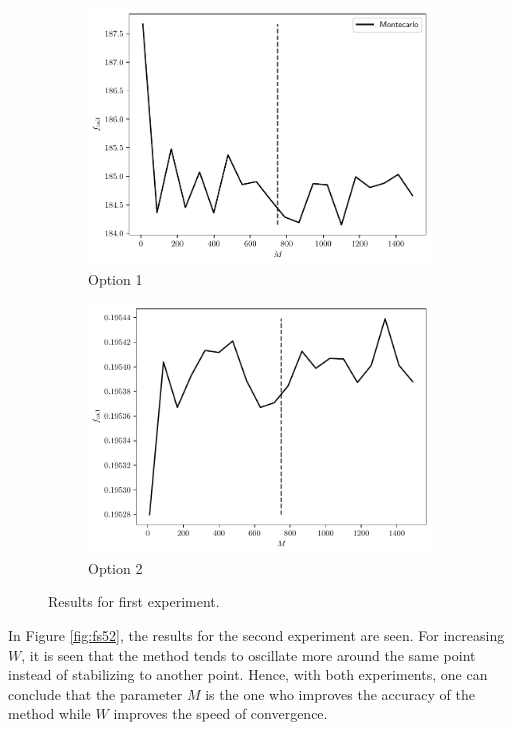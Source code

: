 \documentclass[11pt]{article}
\theoremstyle{definition}
\theoremstyle{remark}
\theoremstyle{remark}
\begin{document}
\begin{figure}[]
  \centering
  \begin{subfigure}[b]{0.45\textwidth}
    \centering
    \includegraphics[scale=.5]{../plts/fifth_a_sens_opt1}
    \caption{Option 1}
  \end{subfigure}
  \begin{subfigure}[b]{0.45\textwidth}
    \centering
    \includegraphics[scale=.5]{../plts/fifth_a_sens_opt2}
    \caption{Option 2}
  \end{subfigure}
  \caption{Results for first experiment.}
  \label{fig:fs51}
\end{figure}

In Figure \ref{fig:fs52}, the results for the second experiment are seen. For
increasing $W$, it is seen that the method tends to oscillate more around the
same point instead of stabilizing to another point. Hence, with both
experiments, one can conclude that the parameter $M$ is the one who improves the
accuracy of the method while $W$ improves the speed of convergence.
\end{document}
